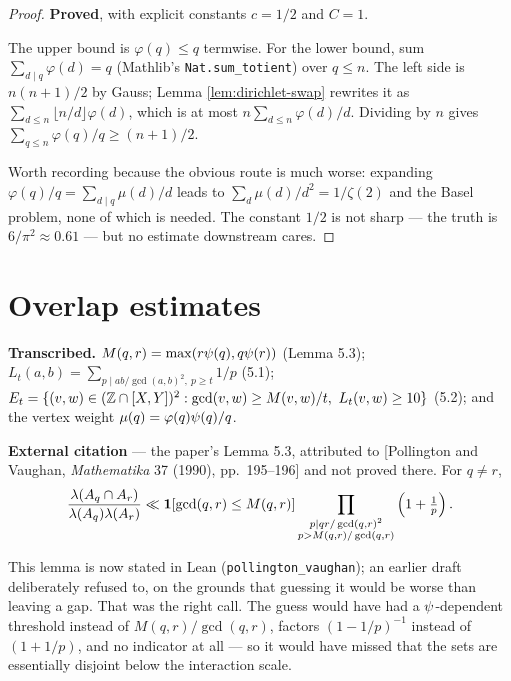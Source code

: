\begin{proof}
  \leanok
  \textbf{Proved}, with explicit constants $c = 1/2$ and $C = 1$.

  The upper bound is $\varphi(q) \leq q$ termwise. For the lower bound, sum
  $\sum_{d \mid q} \varphi(d) = q$ (Mathlib's \texttt{Nat.sum\_totient}) over $q \leq n$.
  The left side is $n(n+1)/2$ by Gauss; Lemma \ref{lem:dirichlet-swap} rewrites it as
  $\sum_{d \leq n} \lfloor n/d \rfloor \varphi(d)$, which is at most
  $n \sum_{d \leq n} \varphi(d)/d$. Dividing by $n$ gives
  $\sum_{q \leq n} \varphi(q)/q \geq (n+1)/2$.

  Worth recording because the obvious route is much worse: expanding
  $\varphi(q)/q = \sum_{d \mid q} \mu(d)/d$ leads to $\sum_{d} \mu(d)/d^2 = 1/\zeta(2)$
  and the Basel problem, none of which is needed. The constant $1/2$ is not sharp --- the
  truth is $6/\pi^2 \approx 0.61$ --- but no estimate downstream cares.
\end{proof}

\chapter{Overlap estimates}
\label{chap:overlap}

\begin{definition}
  \label{def:section5}
  \leanok
  \textbf{Transcribed.} $M(q,r) = \max(r\psi(q), q\psi(r))$ (Lemma 5.3);
  $L_t(a,b) = \sum_{p \mid ab/\gcd(a,b)^2,\ p \geq t} 1/p$ (5.1);
  $E_t = \{(v,w) \in (\mathbb{Z} \cap [X,Y])^2 : \gcd(v,w) \geq M(v,w)/t,\ L_t(v,w) \geq 10\}$
  (5.2); and the vertex weight $\mu(q) = \varphi(q)\psi(q)/q$.
\end{definition}

\begin{lemma}
  \label{lem:pollington-vaughan}
  \notready
  \textbf{External citation} --- the paper's Lemma 5.3, attributed to
  [Pollington and Vaughan, \emph{Mathematika} 37 (1990), pp.\ 195--196] and not proved
  there. For $q \neq r$,
  \[ \frac{\lambda(A_q \cap A_r)}{\lambda(A_q)\lambda(A_r)} \ll
     \mathbf{1}[\gcd(q,r) \leq M(q,r)]
     \prod_{\substack{p \mid qr/\gcd(q,r)^2 \\ p > M(q,r)/\gcd(q,r)}}
     \left(1 + \tfrac1p\right). \]
\end{lemma}

\begin{remark}
  This lemma is now stated in Lean (\texttt{pollington\_vaughan}); an earlier draft
  deliberately refused to, on the grounds that guessing it would be worse than leaving a
  gap. That was the right call. The guess would have had a $\psi$-dependent threshold
  instead of $M(q,r)/\gcd(q,r)$, factors $(1-1/p)^{-1}$ instead of $(1+1/p)$, and no
  indicator at all --- so it would have missed that the sets are essentially disjoint
  below the interaction scale.
\end{remark}

